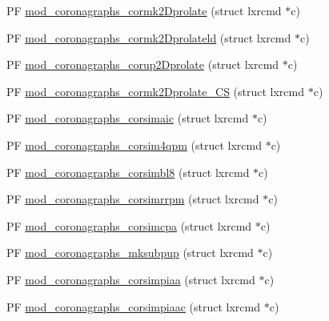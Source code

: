 \begin{DoxyCompactItemize}
\item 
P\+F \hyperlink{PIAACMCdesign_2src_2coronagraphs_2coronagraphs-util_8c_a4a8c6bc3b436950d57c8edff7d08c8b1}{mod\+\_\+coronagraphs\+\_\+cormk2\+Dprolate} (struct lxrcmd $\ast$c)
\item 
P\+F \hyperlink{PIAACMCdesign_2src_2coronagraphs_2coronagraphs-util_8c_a0e2a39ce8179e984872fc28ed424a83e}{mod\+\_\+coronagraphs\+\_\+cormk2\+Dprolateld} (struct lxrcmd $\ast$c)
\item 
P\+F \hyperlink{PIAACMCdesign_2src_2coronagraphs_2coronagraphs-util_8c_a949c485b2474e41f248a17478008a164}{mod\+\_\+coronagraphs\+\_\+corup2\+Dprolate} (struct lxrcmd $\ast$c)
\item 
P\+F \hyperlink{PIAACMCdesign_2src_2coronagraphs_2coronagraphs-util_8c_aa5a2f9ae091e94fad26d42f8d55467d3}{mod\+\_\+coronagraphs\+\_\+cormk2\+Dprolate\+\_\+\+C\+S} (struct lxrcmd $\ast$c)
\item 
P\+F \hyperlink{PIAACMCdesign_2src_2coronagraphs_2coronagraphs-util_8c_a9fa4dfe8c15d371ec5f9ab96589e350b}{mod\+\_\+coronagraphs\+\_\+corsimaic} (struct lxrcmd $\ast$c)
\item 
P\+F \hyperlink{PIAACMCdesign_2src_2coronagraphs_2coronagraphs-util_8c_aa1e124dd3e89153a39139d1bc5f48a6c}{mod\+\_\+coronagraphs\+\_\+corsim4qpm} (struct lxrcmd $\ast$c)
\item 
P\+F \hyperlink{PIAACMCdesign_2src_2coronagraphs_2coronagraphs-util_8c_a3ea43d8fb405d63839784ce312d88f53}{mod\+\_\+coronagraphs\+\_\+corsimbl8} (struct lxrcmd $\ast$c)
\item 
P\+F \hyperlink{PIAACMCdesign_2src_2coronagraphs_2coronagraphs-util_8c_a02e9ac984e27521eaf1054d546ca9d8e}{mod\+\_\+coronagraphs\+\_\+corsimrrpm} (struct lxrcmd $\ast$c)
\item 
P\+F \hyperlink{PIAACMCdesign_2src_2coronagraphs_2coronagraphs-util_8c_af6fc8c21c4930344b7d4fd71b5ab062b}{mod\+\_\+coronagraphs\+\_\+corsimcpa} (struct lxrcmd $\ast$c)
\item 
P\+F \hyperlink{PIAACMCdesign_2src_2coronagraphs_2coronagraphs-util_8c_afdac82ed1f2f851d2601fc33afe9bbad}{mod\+\_\+coronagraphs\+\_\+mksubpup} (struct lxrcmd $\ast$c)
\item 
P\+F \hyperlink{PIAACMCdesign_2src_2coronagraphs_2coronagraphs-util_8c_ac5101e2ead368ac863546684da4310fe}{mod\+\_\+coronagraphs\+\_\+corsimpiaa} (struct lxrcmd $\ast$c)
\item 
P\+F \hyperlink{PIAACMCdesign_2src_2coronagraphs_2coronagraphs-util_8c_a103ebd989fc710ee5078cbad55f80122}{mod\+\_\+coronagraphs\+\_\+corsimpiaac} (struct lxrcmd $\ast$c)

\end{DoxyCompactItemize}
